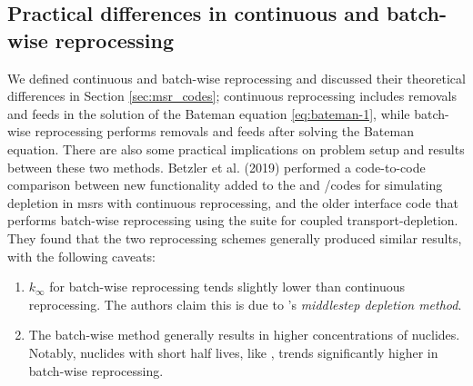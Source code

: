 \subsection{Practical differences in continuous and batch-wise reprocessing}
We defined continuous and batch-wise reprocessing and discussed their
theoretical differences in Section \ref{sec:msr_codes}; continuous reprocessing
includes removals and feeds in the solution of the Bateman equation \ref{eq:bateman-1},
while batch-wise reprocessing performs removals and feeds after solving the Bateman
equation. There are also some
practical implications on problem setup and results between these two methods.
Betzler et al. (2019) \cite{betzler_molten_2019} performed a code-to-code
comparison between new functionality added to the \ORIGEN and \SCALE/\TRITON codes
for simulating depletion in \Gls{msr}s with continuous reprocessing, and the
older \ChemTriton \cite{betzler_molten_2017} interface code that performs
batch-wise reprocessing using the \SCALE suite for coupled transport-depletion.
They found that the two reprocessing schemes generally produced similar results,
with the following caveats:
\begin{enumerate}
    \item $k_{\infty}$ for batch-wise reprocessing tends slightly lower than  continuous reprocessing. The authors claim this is due to \SCALE's {\it middlestep depletion method}. 
    \item The batch-wise method generally results in higher concentrations of nuclides. Notably, nuclides with short half lives, like , trends significantly higher in batch-wise reprocessing.
\end{enumerate}


